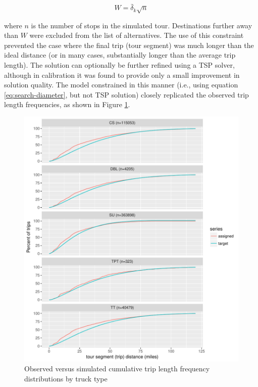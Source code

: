 \begin{equation}\label{eq:search-diameter}
W = {\bar \delta_k} \sqrt{n}
\end{equation}

\noindent where $n$ is the number of stops in the simulated tour. Destinations further away than $W$ were excluded from the list of alternatives. The use of this constraint prevented the case where the final trip (tour segment) was much longer than the ideal distance (or in many cases, substantially longer than the average trip length). The solution can optionally be further refined using a TSP solver, although in calibration it was found to provide only a small improvement in solution quality. The model constrained in this manner (i.e., using equation \ref{eq:search-diameter}, but not TSP solution) closely replicated the observed trip length frequencies, as shown in Figure \ref{fig:ct-observed-trip-lengths}. 

\begin{figure}
\centering
\includegraphics[scale=0.95]{figures/trip-length-comparisons.pdf}
\caption{Observed versus simulated cumulative trip length frequency distributions by truck type}
\label{fig:ct-observed-trip-lengths}
\end{figure}

